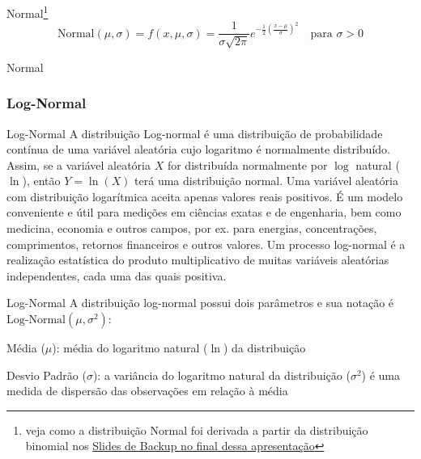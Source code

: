 \begin{frame}{Normal\footnote{veja como a distribuição Normal foi derivada a partir da distribuição binomial nos \hyperlink{appendixnormal}{Slides de Backup no final dessa apresentação}}}
	$$\text{Normal}(\mu,\sigma) = f(x, \mu, \sigma) = \frac{1}{\sigma{\sqrt{2\pi }}}e^{-{\frac{1}{2}}\left({\frac {x-\mu }{\sigma }}\right)^{2}} \quad \text{para $\sigma > 0$}$$
\end{frame}

\begin{frame}{Normal}
	\centering
\end{frame}

\subsubsection{Log-Normal}
\begin{frame}{Log-Normal}
	A distribuição Log-normal é uma distribuição de probabilidade contínua de uma
	variável aleatória cujo logaritmo é normalmente distribuído. Assim, se a variável
	aleatória $X$ for distribuída normalmente por $\log$ natural ($\ln$),
	então $Y = \ln(X)$ terá uma distribuição normal.
	\vfill
	Uma variável aleatória com distribuição logarítmica aceita apenas valores reais
	positivos. É um modelo conveniente e útil para medições em ciências exatas e de
	engenharia, bem como medicina, economia e outros campos, por ex. para energias,
	concentrações, comprimentos, retornos financeiros e outros valores.
	\vfill
	Um processo log-normal é a realização estatística do produto multiplicativo de
	muitas variáveis aleatórias independentes, cada uma das quais positiva.
\end{frame}

\begin{frame}{Log-Normal}
	A distribuição log-normal possui dois parâmetros e sua notação é
	$\text{Log-Normal}(\mu, \sigma^2)$:
	\begin{vfilleditems}
		\item Média ($\mu$): média do logaritmo natural ($\ln$) da distribuição
		\item Desvio Padrão ($\sigma$): a variância do logaritmo natural da distribuição ($\sigma^2$) é uma medida de dispersão das observações em relação à média
	\end{vfilleditems}
\end{frame}

